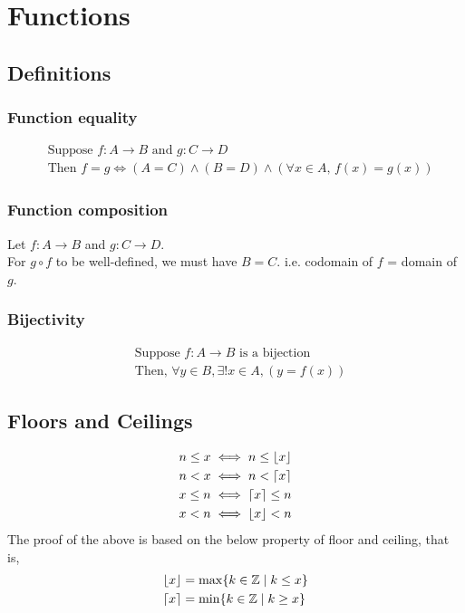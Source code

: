 \documentclass{article}
\DeclarePairedDelimiter\ceil{\lceil}{\rceil}
\DeclarePairedDelimiter\floor{\lfloor}{\rfloor}
\begin{document}
\section{Functions}
\subsection{Definitions}
\subsubsection{Function equality}
\begin{align*}
    &\text{Suppose } f:A\rightarrow B \text{ and } g:C\rightarrow D\\
    &\text{Then } f=g\Longleftrightarrow (A=C)\land (B=D)\land (\forall x\in A,\, f\left(x\right)=g\left(x\right))
\end{align*}

\subsubsection{Function composition}
Let $f: A\rightarrow B$ and $g: C\rightarrow D$.\\
For $g\circ f$ to be well-defined, we must have $B=C$.
i.e. codomain of $f$ = domain of $g$.

\subsubsection{Bijectivity}
\begin{align*}
    &\text{Suppose }f:A\rightarrow B\text{ is a bijection}\\
    &\text{Then, }\forall y\in B,\exists!x\in A,\left(y=f\left(x\right)\right)
\end{align*}

\subsection{Floors and Ceilings}
\begin{align*}
    &n\leq x\iff n\leq \floor{x}\\
    &n<x\iff n<\ceil{x}\\
    &x\leq n\iff \ceil{x}\leq n\\
    &x<n \iff \floor{x}<n
\end{align*}
The proof of the above is based on the below property of floor and ceiling, that is,
\begin{align*}
    &\floor{x}=\max \{k\in \mathbb{Z}\mid k\leq x\}\\
    &\ceil{x}=\min \{k\in \mathbb{Z}\mid k\geq x\}
\end{align*}
\end{document}
